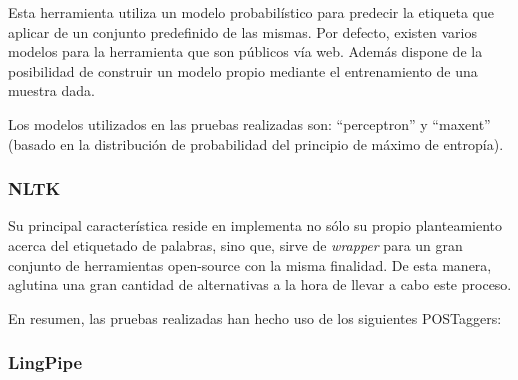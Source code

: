 \documentclass[runningheads,a4paper]{llncs}
\theoremstyle{break}
\begin{document}
Esta herramienta utiliza un modelo probabilístico para predecir la etiqueta que aplicar de un conjunto predefinido de las mismas. Por defecto, existen varios modelos para la herramienta que son públicos vía web. Además dispone de la posibilidad de construir un modelo propio mediante el entrenamiento de una muestra dada. 

Los modelos utilizados en las pruebas realizadas son: ``perceptron'' y ``maxent'' (basado en la distribución de probabilidad del principio de máximo de entropía).

\newpage

\subsubsection{NLTK}
\textbf{}

Su principal característica reside en implementa no sólo su propio planteamiento acerca del etiquetado de palabras, sino que, sirve de \textit{wrapper} para un gran conjunto de herramientas open-source con la misma finalidad. De esta manera, aglutina una gran cantidad de alternativas a la hora de llevar a cabo este proceso.

En resumen, las pruebas realizadas han hecho uso de los siguientes POSTaggers:

\begin{Parallel}{0.45\textwidth}{0.45\textwidth}
\ParallelPar
\end{Parallel}



\subsubsection{LingPipe}
\textbf{}
\end{document}
